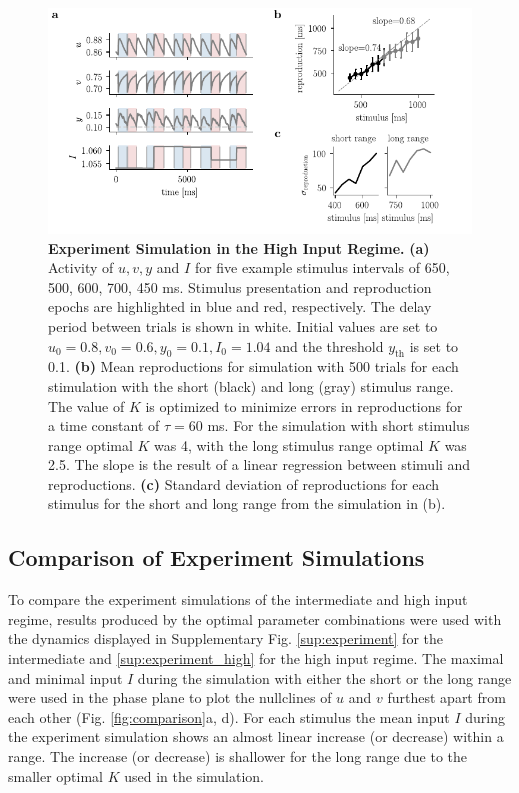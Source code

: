 \documentclass[10pt]{article}
\begin{document}
\begin{figure}[ht]
	\centering
	\includegraphics{figures/highI.pdf}
	\caption{\textbf{Experiment Simulation in the High Input Regime.} 
	\textbf{(a)} Activity of $u, v, y$ and $I$ for five example stimulus intervals of 650, 500, 600, 700, 450 ms. Stimulus presentation and reproduction epochs are highlighted in blue and red, respectively. The delay period between trials is shown in white. Initial values are set to $u_0=0.8 , v_0=0.6 , y_0=0.1, I_0=1.04$ and the threshold $y_{\text{th}}$ is set to 0.1. 
	\textbf{(b)} Mean reproductions for simulation with 500 trials for each stimulation with the short (black) and long (gray) stimulus range. The value of $K$ is optimized to minimize errors in reproductions for a time constant of $\tau = 60$ ms. For the simulation with short stimulus range optimal $K$ was 4, with the long stimulus range optimal $K$ was 2.5.
		The slope is the result of a linear regression between stimuli and reproductions.
	\textbf{(c)} Standard deviation of reproductions for each stimulus for the short and long range from the simulation in (b).
	}
\label{highI}
\end{figure}

\subsection{Comparison of Experiment Simulations}
To compare the experiment simulations of the intermediate and high input regime, results produced by the optimal parameter combinations were used with the dynamics displayed in Supplementary Fig. \ref{sup:experiment} for the intermediate and \ref{sup:experiment_high} for the high input regime.
The maximal and minimal input $I$ during the simulation with either the short or the long range were used in the phase plane to plot the nullclines of $u$ and $v$ furthest apart from each other (Fig. \ref{fig:comparison}a, d).
For each stimulus the mean input $I$ during the experiment simulation shows an almost linear increase (or decrease) within a range. The increase (or decrease) is shallower for the long range due to the smaller optimal $K$ used in the simulation.
\end{document}
